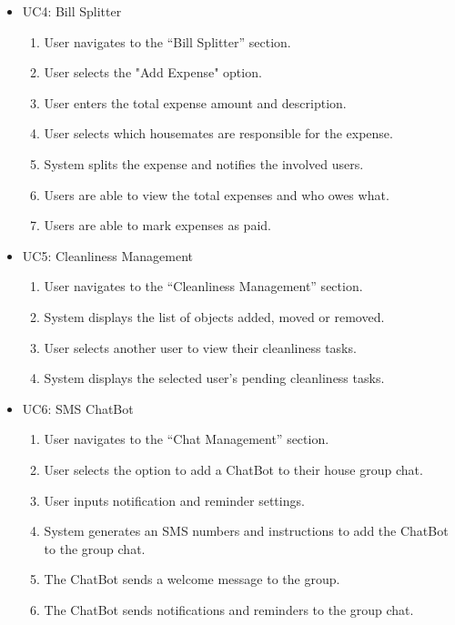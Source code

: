 \documentclass{scrreprt}
\theoremstyle{definition}
\begin{document}
\begin{itemize}
    \item UC4: Bill Splitter
    \begin{enumerate}
        \item User navigates to the “Bill Splitter” section.
        \item User selects the "Add Expense" option.
        \item User enters the total expense amount and description.
        \item User selects which housemates are responsible for the expense.
        \item System splits the expense and notifies the involved users.
        \item Users are able to view the total expenses and who owes what.
        \item Users are able to mark expenses as paid.
    \end{enumerate}
    
    \item UC5: Cleanliness Management
    \begin{enumerate}
        \item User navigates to the “Cleanliness Management” section.
        \item System displays the list of objects added, moved or removed.
        \item User selects another user to view their cleanliness tasks.
        \item System displays the selected user’s pending cleanliness tasks.
    \end{enumerate}
    
    \item UC6: SMS ChatBot
    \begin{enumerate}
        \item User navigates to the “Chat Management” section.
        \item User selects the option to add a ChatBot to their house group chat.
        \item User inputs notification and reminder settings.
        \item System generates an SMS numbers and instructions to add the ChatBot to the group chat.
        \item The ChatBot sends a welcome message to the group.
        \item The ChatBot sends notifications and reminders to the group chat.
    \end{enumerate}
    
\end{itemize}
    
\end{document}
